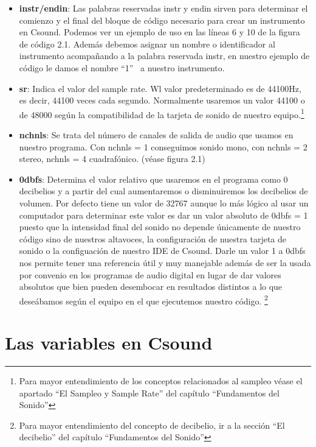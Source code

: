\begin{itemize}
 \item \textbf{instr/endin}: Las palabras reservadas instr y endin sirven para determinar el comienzo y el final del bloque de código necesario para crear un instrumento en Csound. Podemos ver un ejemplo de uso en las líneas 6 y 10 de la figura de código 2.1.
 Además debemos asignar un nombre o identificador al instrumento acompañando a la palabra reservada instr, en nuestro ejemplo de código le damos el nombre ``1'' \ a nuestro instrumento.
 
 \item \textbf{sr}: Indica el valor del sample rate. Wl valor predeterminado es de 44100Hz, es decir, 44100 veces cada segundo. Normalmente usaremos un valor 44100 o de 48000 según la compatibilidad de la tarjeta de sonido de nuestro equipo.\footnote{Para mayor entendimiento de los conceptos relacionados al sampleo véase el apartado ``El Sampleo y Sample Rate'' del capítulo ``Fundamentos del Sonido''}
 
 \item \textbf{nchnls}: Se trata del número de canales de salida de audio que usamos en nuestro programa. Con nchnls = 1 conseguimos sonido mono, con nchnls = 2 stereo, nchnls = 4 cuadrafónico. (véase figura 2.1)

 \item \textbf{0dbfs}: Determina el valor relativo que usaremos en el programa como 0 decibelios y a partir del cual aumentaremos o disminuiremos los decibelios de volumen. Por defecto tiene un valor de 32767 aunque lo más lógico al usar un computador para determinar este valor es dar un valor absoluto de 0dbfs = 1 puesto que la intensidad final del sonido no depende únicamente de nuestro código sino de nuestros altavoces, la configuración de nuestra tarjeta de sonido o la configuación de nuestro IDE de Csound. Darle un valor 1 a 0dbfs nos permite tener una referencia útil y muy manejable además de ser la usada por convenio en los programas de audio digital en lugar de dar valores absolutos que bien pueden desembocar en resultados distintos a lo que deseábamos según el equipo en el que ejecutemos nuestro código. \footnote{Para mayor entendimiento del concepto de decibelio, ir a la sección ``El decibelio''  del capítulo ``Fundamentos del Sonido''}
\end{itemize}

\section{Las variables en Csound}\label{sec:variables}

